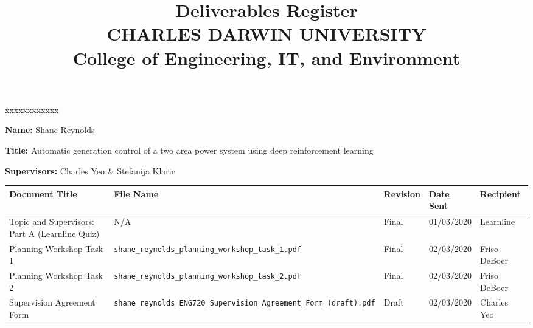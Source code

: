 \documentclass[10pt, landscape]{article}
\title{	
		Deliverables Register\\
		CHARLES DARWIN UNIVERSITY\\
		College of Engineering, IT, and Environment
	  }
\author{}
\date{}
\begin{document}
	
	\maketitle
	
	\begin{namelist}{xxxxxxxxxxxx}
		\item[{\bf Name:}]
			Shane Reynolds
		\item[{\bf Title:}]
			Automatic generation control of a two area power system using deep reinforcement learning
		\item[{\bf Supervisors:}]
			Charles Yeo \& Stefanija Klaric
	\end{namelist}
	
	\small
	\begin{tabular}{p{7cm}p{10cm}p{1.5cm}p{2cm}p{2cm}}
	\toprule
	\textbf{Document Title}							& \textbf{File Name}				& \textbf{Revision} & \textbf{Date Sent} 	& \textbf{Recipient} \\
	\midrule
	Topic and Supervisors: Part A (Learnline Quiz)	& N/A								& Final 			& 01/03/2020		 	& Learnline\\
	Planning Workshop Task 1						& \verb|shane_reynolds_planning_workshop_task_1.pdf|						& Final				& 02/03/2020		 	& Friso DeBoer\\
	Planning Workshop Task 2						& \verb|shane_reynolds_planning_workshop_task_2.pdf|						& Final				& 02/03/2020			& Friso DeBoer\\
	Supervision Agreement Form						& \verb|shane_reynolds_ENG720_Supervision_Agreement_Form_(draft).pdf|						& Draft				& 02/03/2020			& Charles Yeo\\
	\bottomrule
	\end{tabular}
\end{document}
